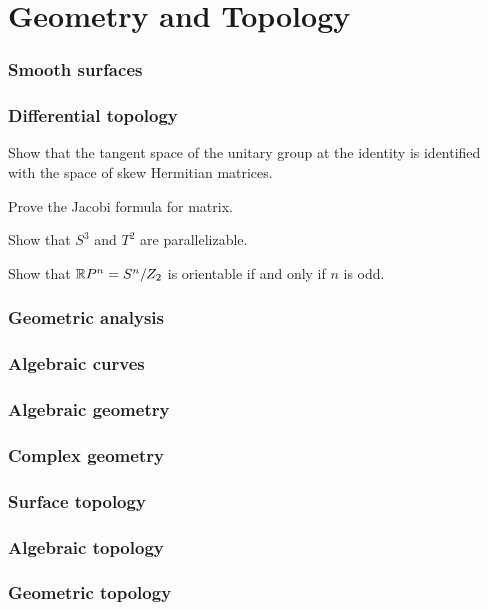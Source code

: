 \documentclass[11pt]{article}
\begin{document}
\newpage
\part{Geometry and Topology}
\setcounter{section}{0}

\section{Smooth surfaces}

\section{Differential topology}

	\begin{prb}
	Show that the tangent space of the unitary group at the identity is identified with the space of skew Hermitian matrices.
	\end{prb}

	\begin{prb}
	Prove the Jacobi formula for matrix.
	\end{prb}

	\begin{prb}
	Show that $S^3$ and $T^2$ are parallelizable.
	\end{prb}

	\begin{prb}
	Show that $\mathbb{R} P^n=S^n/Z_2$ is orientable if and only if $n$ is odd.
	\end{prb}

\section{Geometric analysis}


\section{Algebraic curves}
\section{Algebraic geometry}
\section{Complex geometry}

\section{Surface topology}
\section{Algebraic topology}
\section{Geometric topology}
\end{document}
